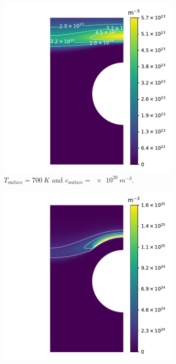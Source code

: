 \begin{figure}
    \centering
    \begin{subfigure}{0.5\linewidth}
        \centering
        \includegraphics[height=\linewidth]{Figures/Chapter3/monoblocks/parametric_study/retention_T=7.000e+02;c=1.00e+20.pdf}
        \caption{$T_\mathrm{surface} = \SI{700}{K}$ and $c_\mathrm{surface} = \SI{e20}{m^{-3}}$.}
    \end{subfigure}%
    \begin{subfigure}{0.5\linewidth}
        \centering
        \includegraphics[height=\linewidth]{Figures/Chapter3/monoblocks/parametric_study/retention_T=1.000e+03;c=1.00e+21.pdf}

\end{subfigure}
\end{figure}
